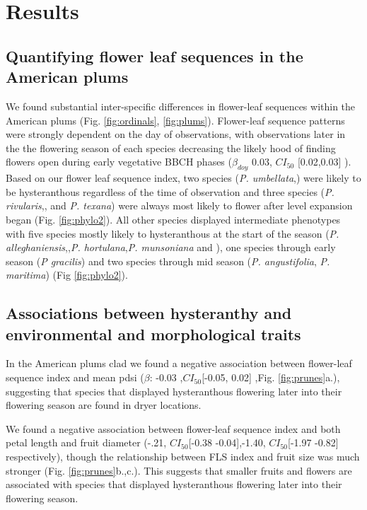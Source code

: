 \documentclass{article}[11pt]
\begin{document}

\section*{Results}
\subsection*{Quantifying flower leaf sequences in the American plums}
We found substantial inter-specific differences in flower-leaf sequences within the American plums (Fig. \ref{fig:ordinals}, \ref{fig:plums}). %
Flower-leaf sequence patterns were strongly dependent on the day of observations, with observations later in the the flowering season of each species decreasing the likely hood of finding flowers open during early vegetative BBCH phases ($\beta_{doy}$ 0.03, $CI_{50}$ [0.02,0.03] ). Based on our flower leaf sequence index, two species (\textit{P. umbellata},) were likely to be hysteranthous regardless of the time of observation and three species (\textit{P. rivularis},, and \textit{P. texana}) were always most likely to flower after level expansion began (Fig. \ref{fig:phylo2}). All other species displayed intermediate phenotypes with five species mostly likely to hysteranthous at the start of the season (\textit{P. alleghaniensis},,\textit{P. hortulana},\textit{P. munsoniana} and ), one species through early season (\textit{P gracilis}) and two species through mid season (\textit{P. angustifolia}, \textit{P. maritima}) (Fig \ref{fig:phylo2}).

\subsection*{Associations between hysteranthy and environmental and morphological traits}
In the American plums clad we found a negative association between flower-leaf sequence index and mean pdsi ($\beta$: -0.03 ,$CI_{50}$[-0.05,  0.02] ,Fig. \ref{fig:prunes}a.), suggesting that species that displayed hysteranthous flowering later into their flowering season are found in dryer locations. 

We found a negative association between flower-leaf sequence index and both petal length and fruit diameter (-.21, $CI_{50}$[-0.38 -0.04],-1.40, $CI_{50}$[-1.97 -0.82] respectively), though the relationship between FLS index and fruit size was much stronger (Fig. \ref{fig:prunes}b.,c.). This suggests that smaller fruits and flowers are associated with species that displayed hysteranthous flowering later into their flowering season.
\end{document}
